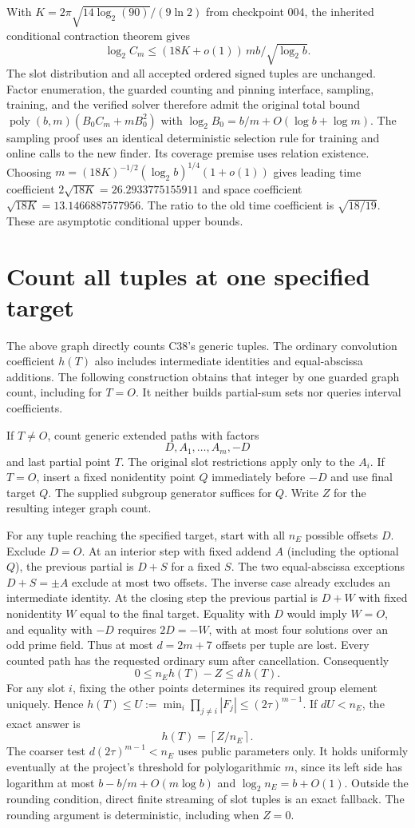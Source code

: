 \documentclass[11pt]{article}
\begin{document}
With $K=2\pi\sqrt{14\log_2(90)}/(9\ln2)$ from checkpoint 004,
the inherited conditional contraction theorem gives
\[
 \log_2 C_m \le (18K+o(1))\,mb/\sqrt{\log_2 b}.
\]
The slot distribution and all accepted ordered signed tuples are
unchanged. Factor enumeration, the guarded counting and pinning
interface, sampling, training, and the verified solver therefore admit
the original total bound $\operatorname{poly}(b,m)(B_0 C_m+mB_0^2)$
with $\log_2 B_0=b/m+O(\log b+\log m)$. The sampling proof uses an
identical deterministic selection rule for training and online calls
to the new finder. Its coverage premise uses relation existence.
Choosing $m=(18K)^{-1/2}(\log_2 b)^{1/4}(1+o(1))$ gives leading
time coefficient $2\sqrt{18K}=26.2933775155911$ and space coefficient
$\sqrt{18K}=13.1466887577956$. The ratio to the old time coefficient
is $\sqrt{18/19}$. These are asymptotic conditional upper bounds.

\section{Count all tuples at one specified target}
The above graph directly counts C38's generic tuples. The ordinary
convolution coefficient $h(T)$ also includes intermediate identities
and equal-abscissa additions. The following construction obtains that
integer by one guarded graph count, including for $T=O$. It neither
builds partial-sum sets nor queries interval coefficients.

If $T\ne O$, count generic extended paths with factors
\[
 D,A_1,\ldots,A_m,-D
\]
and last partial point $T$. The original slot restrictions apply only
to the $A_i$. If $T=O$, insert a fixed nonidentity point $Q$ immediately
before $-D$ and use final target $Q$. The supplied subgroup generator
suffices for $Q$. Write $Z$ for the resulting integer graph count.

For any tuple reaching the specified target, start with all $n_E$
possible offsets $D$. Exclude $D=O$. At an interior step with fixed
addend $A$ (including the optional $Q$), the previous partial is
$D+S$ for a fixed $S$. The two equal-abscissa exceptions $D+S=\pm A$
exclude at most two offsets. The inverse case already excludes an
intermediate identity. At the closing step the previous partial is
$D+W$ with fixed nonidentity $W$ equal to the final target.
Equality with $D$ would imply $W=O$, and equality with $-D$ requires
$2D=-W$, with at most four solutions over an odd prime field.
Thus at most $d=2m+7$ offsets per tuple are lost. Every counted path
has the requested ordinary sum after cancellation. Consequently
\[
    0\le n_Eh(T)-Z\le d\,h(T).
\]
For any slot $i$, fixing the other points determines its required group
element uniquely. Hence $h(T)\le U:=\min_i\prod_{j\ne i}|F_j|
\le (2\tau)^{m-1}$. If $dU<n_E$, the exact answer is
\[
                 h(T)=\left\lceil Z/n_E\right\rceil .
\]
The coarser test $d(2\tau)^{m-1}<n_E$ uses public parameters only.
It holds uniformly eventually at the project's threshold for
polylogarithmic $m$, since its left side has logarithm at most
$b-b/m+O(m\log b)$ and $\log_2 n_E=b+O(1)$. Outside the rounding
condition, direct finite streaming of slot tuples is an exact fallback.
The rounding argument is deterministic, including when $Z=0$.
\end{document}
